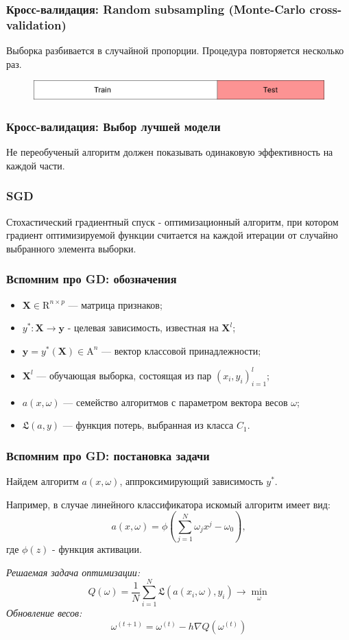 \documentclass[11pt]{beamer}
\begin{document}
	\begin{frame}
		\frametitle{Кросс-валидация: Random subsampling (Monte-Carlo cross-validation)}
		Выборка разбивается в случайной пропорции. Процедура повторяется несколько раз.
		\begin{figure}
			\includegraphics[width=1\linewidth]{../Report/imgs/completecrossvalidation}
		\end{figure}
	\end{frame}
	
	\begin{frame}
		\frametitle{Кросс-валидация: Выбор лучшей модели}
		Не переобученый алгоритм должен показывать одинаковую эффективность на каждой части.
		
	\end{frame}

	\begin{frame}
		\frametitle{SGD}
		Стохастический градиентный спуск - оптимизационный алгоритм, при котором градиент оптимизируемой функции считается на каждой итерации от случайно выбранного элемента выборки.
	\end{frame}
	\begin{frame}
		\frametitle{Вспомним про GD: обозначения}
		\begin{itemize}
			\item $ \bm{X} \in \mathrm{R}^{n\times p} $ --- матрица признаков;
			\item $ y^*:\bm{X}\rightarrow\bm{y} $ - целевая зависимость, известная на $ \bm{X}^l $;
			\item $ \bm{y} = y^*(\bm{X}) \in  \mathrm{A}^n $ --- вектор классовой принадлежности;
			\item $ \bm{X}^l $ --- обучающая выборка, состоящая из пар $ (x_i, y_i)_{i=1}^l $;
			\item $ a(x, \omega) $ --- семейство алгоритмов с параметром вектора весов $ \omega $;
			\item $ \mathfrak{L}(a, y) $ --- функция потерь, выбранная из класса $ C_1 $.
			
		\end{itemize}
		
	\end{frame}
	
	\begin{frame}
		\frametitle{Вспомним про GD: постановка задачи}
		Найдем алгоритм $ a(x, \omega) $, аппроксимирующий зависимость $ y^* $.
		
		Например, в случае линейного классификатора искомый алгоритм имеет вид:
		$$ a(x, \omega) = \phi(\sum\limits_{j=1}^N \omega_jx^j - \omega_0), $$где $ \phi(z) $ - функция активации. 
		
		\textit{Решаемая задача оптимизации:}
		$$ Q(\omega) = \frac{1}{N}\sum\limits_{i=1}^{N}\mathfrak{L}(a(x_i, \omega), y_i)\rightarrow\min\limits_{\omega} $$
		\textit{Обновление весов:}
		$$ \omega^{(t+1)} = \omega^{(t)} - h\nabla Q(\omega^{(t)}) $$
		
	\end{frame}
\end{document}
